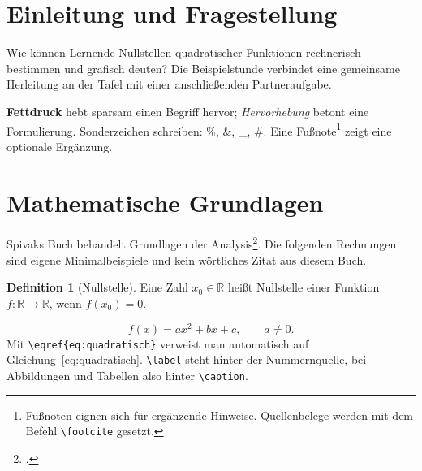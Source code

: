 \documentclass[12pt,a4paper,ngerman]{scrartcl}
\theoremstyle{definition}
\newtheorem{definition}[satz]{Definition}
\begin{document}
\section{Einleitung und Fragestellung}
\label{sec:einleitung}
Wie können Lernende Nullstellen quadratischer Funktionen rechnerisch bestimmen
und grafisch deuten? Die Beispielstunde verbindet eine gemeinsame Herleitung
an der Tafel mit einer anschließenden Partneraufgabe.

\textbf{Fettdruck} hebt sparsam einen Begriff hervor; \emph{Hervorhebung}
betont eine Formulierung. Sonderzeichen schreiben: \%, \&, \_, \#.
Eine Fußnote\footnote{Fußnoten eignen sich für ergänzende Hinweise.
Quellenbelege werden mit dem Befehl \texttt{\textbackslash footcite} gesetzt.}
zeigt eine optionale Ergänzung.

\section{Mathematische Grundlagen}
\label{sec:grundlagen}
Spivaks Buch behandelt Grundlagen der Analysis\footcite{spivak2008}. Die folgenden Rechnungen sind eigene
Minimalbeispiele und kein wörtliches Zitat aus diesem Buch.

\begin{definition}[Nullstelle]
  Eine Zahl \(x_0\in\mathbb{R}\) heißt Nullstelle einer Funktion
  \(f\colon\mathbb{R}\to\mathbb{R}\), wenn \(f(x_0)=0\).
\end{definition}

\begin{equation}
  f(x)=ax^2+bx+c, \qquad a\neq 0.
  \label{eq:quadratisch}
\end{equation}
Mit \verb|\eqref{eq:quadratisch}| verweist man automatisch auf
Gleichung~\eqref{eq:quadratisch}. \verb|\label| steht hinter der Nummernquelle,
bei Abbildungen und Tabellen also hinter \verb|\caption|.
\end{document}
